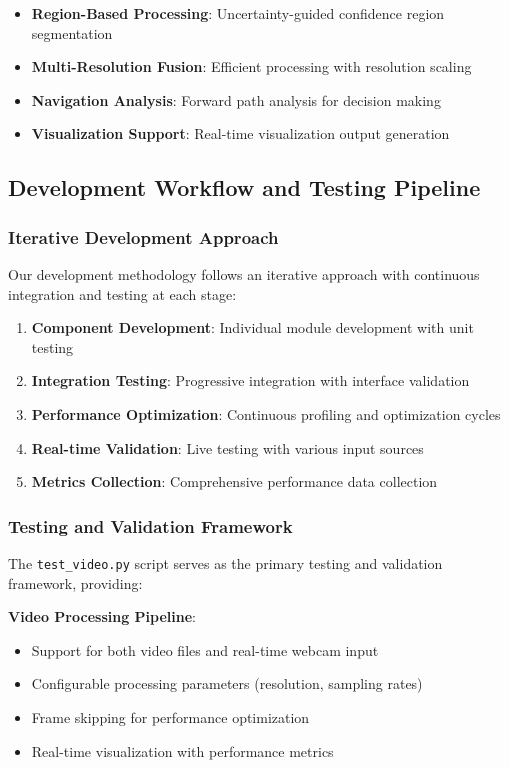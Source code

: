 \documentclass[10pt]{article}
\begin{document}
\begin{itemize}
\item \textbf{Region-Based Processing}: Uncertainty-guided confidence region segmentation
\item \textbf{Multi-Resolution Fusion}: Efficient processing with resolution scaling
\item \textbf{Navigation Analysis}: Forward path analysis for decision making
\item \textbf{Visualization Support}: Real-time visualization output generation
\end{itemize}

\subsection{Development Workflow and Testing Pipeline}

\subsubsection{Iterative Development Approach}

Our development methodology follows an iterative approach with continuous integration and testing at each stage:

\begin{enumerate}
\item \textbf{Component Development}: Individual module development with unit testing
\item \textbf{Integration Testing}: Progressive integration with interface validation
\item \textbf{Performance Optimization}: Continuous profiling and optimization cycles
\item \textbf{Real-time Validation}: Live testing with various input sources
\item \textbf{Metrics Collection}: Comprehensive performance data collection
\end{enumerate}

\subsubsection{Testing and Validation Framework}

The \texttt{test\_video.py} script serves as the primary testing and validation framework, providing:

\textbf{Video Processing Pipeline}:
\begin{itemize}
\item Support for both video files and real-time webcam input
\item Configurable processing parameters (resolution, sampling rates)
\item Frame skipping for performance optimization
\item Real-time visualization with performance metrics
\end{itemize}
\end{document}
